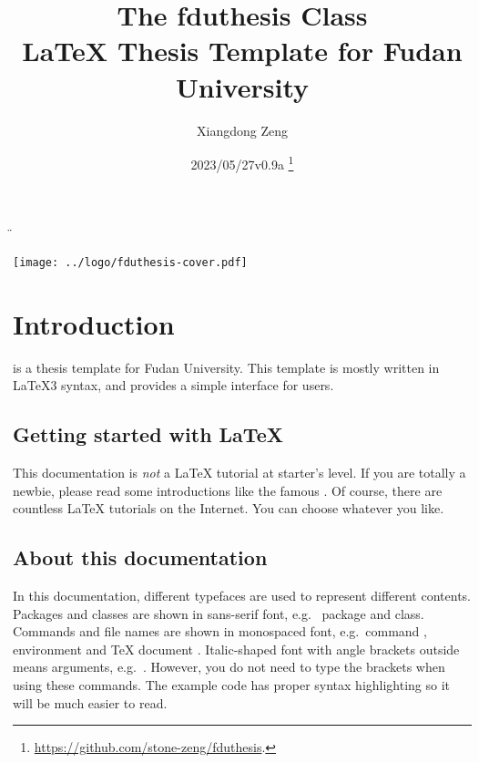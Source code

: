 \documentclass{fdudoc}
\title{\textcolor{MaterialIndigo800}{%
  \textbf{The \textsf{fduthesis} Class \\
    \LaTeX{} Thesis Template for Fudan University}}}
\author{Xiangdong Zeng}
\date{2023/05/27\quad v0.9a%
  \thanks{\url{https://github.com/stone-zeng/fduthesis}.}}
\begin{document}
\DeleteShortVerb\"


\maketitle
\vfill
\begin{center}
  \texttt{[image: ../logo/fduthesis-cover.pdf]}
\end{center}
\vfill
\thispagestyle{plain}
\clearpage

\tableofcontents


\section{Introduction}

 is a thesis template for Fudan University.
This template is mostly written in \LaTeX3 syntax, and
provides a simple interface for users.

\subsection*{Getting started with \LaTeX{}}

This documentation is \emph{not} a \LaTeX{} tutorial at
starter's level. If you are totally a newbie, please read some
introductions like the famous . Of course, there
are countless \LaTeX{} tutorials on the Internet. You can
choose whatever you like.

\subsection*{About this documentation}

In this documentation, different typefaces are used to
represent different contents. Packages and classes are shown
in sans-serif font, e.g.\  package and
 class. Commands and file names are shown in
monospaced font, e.g.\ command , environment
 and \TeX{} document .
Italic-shaped font with angle brackets outside means arguments,
e.g.\ . However, you do not need to type
the brackets when using these commands. The example code has
proper syntax highlighting so it will be much easier to read.
\end{document}
